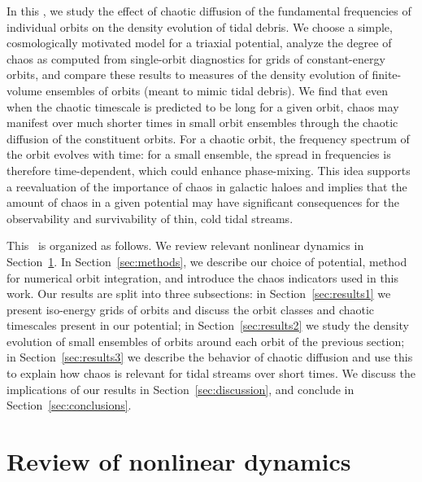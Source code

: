 In this \article, we study the effect of chaotic diffusion of the
fundamental frequencies of individual orbits on the density evolution of tidal
debris. We choose a simple, cosmologically motivated model for a triaxial
potential, analyze the degree of chaos as computed from single-orbit diagnostics
for grids of constant-energy orbits, and compare these results to measures of
the density evolution of finite-volume ensembles of orbits (meant to mimic tidal
debris). We find that even when the chaotic timescale is predicted to be long
for a given orbit, chaos may manifest over much shorter times in small orbit
ensembles through the chaotic diffusion of the constituent orbits. For a chaotic
orbit, the frequency spectrum of the orbit evolves with time: for a small
ensemble, the spread in frequencies is therefore time-dependent, which could
enhance phase-mixing. This idea supports a reevaluation of the importance of
chaos in galactic haloes and implies that the amount of chaos in a given
potential may have significant consequences for the observability and
survivability of thin, cold tidal streams.

This \article\ is organized as follows. We review relevant nonlinear dynamics in
Section~\ref{sec:nldreview}. In Section~\ref{sec:methods}, we describe our
choice of potential, method for numerical orbit integration, and introduce the
chaos indicators used in this work. Our results are split into three
subsections: in Section~\ref{sec:results1} we present iso-energy grids of orbits
and discuss the orbit classes and chaotic timescales present in our potential;
in Section~\ref{sec:results2} we study the density evolution of small ensembles
of orbits around each orbit of the previous section; in
Section~\ref{sec:results3} we describe the behavior of chaotic diffusion and use
this to explain how chaos is relevant for tidal streams over short times. We
discuss the implications of our results in Section~\ref{sec:discussion}, and
conclude in Section~\ref{sec:conclusions}.

\section{Review of nonlinear dynamics}\label{sec:nldreview}

